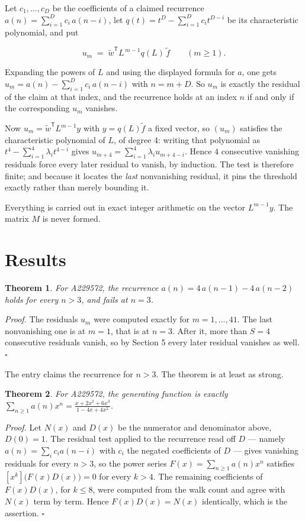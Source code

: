\documentclass[11pt]{article}
\newtheorem{theorem}{Theorem}
\theoremstyle{definition}
\begin{document}
Let $c_1,\dots,c_D$ be the coefficients of a claimed recurrence $a(n) = \sum_{i=1}^{D} c_i\,a(n-i)$, let $q(t) = t^{D} - \sum_{i=1}^{D} c_i t^{D-i}$ be its characteristic polynomial, and put

\[u_m \;=\; \tilde w^{\mathsf T} L^{\,m-1} q(L)\,\tilde f \qquad (m \ge 1).\]

Expanding the powers of $L$ and using the displayed formula for $a$, one gets $u_m = a(n) - \sum_{i=1}^{D} c_i\,a(n-i)$ with $n = m + D$. So $u_m$ is exactly the residual of the claim at that index, and the recurrence holds at an index $n$ if and only if the corresponding $u_m$ vanishes.

Now $u_m = \tilde w^{\mathsf T} L^{m-1} y$ with $y = q(L)\tilde f$ a fixed vector, so $(u_m)$ satisfies the characteristic polynomial of $L$, of degree $4$: writing that polynomial as $t^{4} - \sum_{i=1}^{4} \lambda_i t^{4-i}$ gives $u_{m+4} = \sum_{i=1}^{4} \lambda_i u_{m+4-i}$. Hence $4$ consecutive vanishing residuals force every later residual to vanish, by induction. The test is therefore finite; and because it locates the {\itshape last} nonvanishing residual, it pins the threshold exactly rather than merely bounding it.

Everything is carried out in exact integer arithmetic on the vector $L^{m-1}y$. The matrix $M$ is never formed.

\section{Results}

\begin{theorem} For A229572, the recurrence $a(n) = 4\,a(n-1) - 4\,a(n-2)$ holds for every $n > 3$, and fails at $n = 3$.\end{theorem}

{\itshape Proof.} The residuals $u_m$ were computed exactly for $m = 1,\dots,41$. The last nonvanishing one is at $m = 1$, that is at $n = 3$. After it, more than $S = 4$ consecutive residuals vanish, so by Section 5 every later residual vanishes as well. $\square$

The entry claims the recurrence for $n > 3$. The theorem is at least as strong.

\begin{theorem} For A229572, the generating function is exactly $\sum_{n\ge 1} a(n)x^n = \frac{x + 2x^{2} + 6x^{3}}{1 - 4x + 4x^{2}}$.\end{theorem}

{\itshape Proof.} Let $N(x)$ and $D(x)$ be the numerator and denominator above, $D(0)=1$. The residual test applied to the recurrence read off $D$ --- namely $a(n) = \sum_i c_i a(n-i)$ with $c_i$ the negated coefficients of $D$ --- gives vanishing residuals for every $n > 3$, so the power series $F(x)=\sum_{n\ge 1}a(n)x^n$ satisfies $[x^k]\bigl(F(x)D(x)\bigr) = 0$ for every $k > 4$. The remaining coefficients of $F(x)D(x)$, for $k \le 8$, were computed from the walk count and agree with $N(x)$ term by term. Hence $F(x)D(x) = N(x)$ identically, which is the assertion. $\square$
\end{document}
